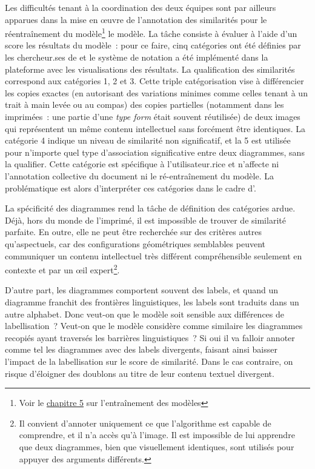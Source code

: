 Les difficultés tenant à la coordination des deux équipes sont par
ailleurs apparues dans la mise en œuvre de l'annotation des similarités pour le réentraînement du modèle\footnote{Voir le \hyperlink{fine-tuner-le-modele}{chapitre 5} sur l'entraînement des modèles} le modèle. La
tâche consiste à évaluer à l'aide d'un score les résultats du modèle~:
pour ce faire, cinq catégories ont été définies par les chercheur.ses de
\vhs et le système de notation a été implémenté dans la plateforme avec
les visualisations des résultats. La qualification des similarités
correspond aux catégories 1, 2 et 3. Cette triple catégorisation vise à
différencier les copies exactes (en autorisant des variations minimes
comme celles tenant à un trait à main levée ou au compas) des copies
partielles (notamment dans les imprimées~: une partie d'une \emph{type
form} était souvent réutilisée) de deux images qui représentent un même
contenu intellectuel sans forcément être identiques. La catégorie 4
indique un niveau de similarité non significatif, et la 5 est utilisée
pour n'importe quel type d'association significative entre deux
diagrammes, sans la qualifier. Cette catégorie est spécifique à
l'utilisateur.rice et n'affecte ni l'annotation collective du document ni le
ré-entraînement du modèle. La problématique est alors d'interpréter ces
catégories dans le cadre d'\eida.

La spécificité des diagrammes rend la tâche de définition des catégories
ardue. Déjà, hors du monde de l'imprimé, il est
impossible de trouver de similarité parfaite. En outre, elle ne peut
être recherchée sur des critères autres qu'aspectuels, car des
configurations géométriques semblables peuvent communiquer un contenu
intellectuel très différent compréhensible seulement en contexte et par
un œil expert\footnote{Il convient d'annoter uniquement ce que
  l'algorithme est capable de comprendre, et il n'a accès qu'à l'image.
  Il est impossible de lui apprendre que deux diagrammes, bien que
  visuellement identiques, sont utilisés pour appuyer des arguments
  différents.}.

D'autre part, les diagrammes comportent souvent des labels, et quand un
diagramme franchit des frontières linguistiques, les labels sont
traduits dans un autre alphabet. Donc veut-on que le modèle soit
sensible aux différences de labellisation~? Veut-on que le modèle
considère comme similaire les diagrammes recopiés ayant traversés les
barrières linguistiques~? Si oui il va falloir annoter comme tel les
diagrammes avec des labels divergents, faisant ainsi baisser l'impact de
la labellisation sur le score de similarité. Dans le cas contraire, on
risque d'éloigner des doublons au titre de leur contenu textuel
divergent.

